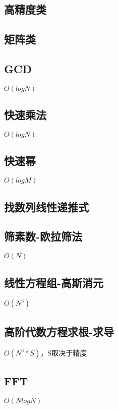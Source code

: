 \documentclass[10pt]{article}
\begin{document}
\subsection{高精度类}


\subsection{矩阵类}


\subsection{GCD}
$O(logN)$


\subsection{快速乘法}
$O(logN)$


\subsection{快速幂}
$O(logM)$


\subsection{找数列线性递推式}


\subsection{筛素数-欧拉筛法}
$O(N)$


\subsection{线性方程组-高斯消元}
$O(N^3)$


\subsection{高阶代数方程求根-求导}
$O(N^3*S)$，S取决于精度


\subsection{FFT}
$O(NlogN)$

\end{document}
